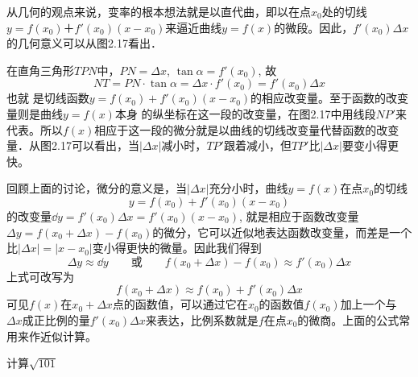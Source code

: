 从几何的观点来说，变率的根本想法就是以直代曲，即以在点$x_0$处的切线$y=f(x_0)＋f'(x_0)(x-x_0)$来逼近曲线$y=f(x)$的微段。因此，$f'(x_0)\Delta x$的几何意义可以从图2.17看出．

\begin{figure}[htp]
    \centering
    \caption{}
\end{figure}

在直角三角形$TPN$中，$PN=\Delta x$, $\tan\alpha=f'(x_0)$, 故
\[NT=PN\cdot \tan\alpha=\Delta x\cdot f'(x_0)=f'(x_0)\Delta x\]
也就
是切线函数$y=f (x_0) +f' (x_0) (x-x_0)$的相应改变量。至于函数的改变量则是曲线$y=f(x)$本身
的纵坐标在这一段的改变量，在图2.17中用线段$NP'$来代表。所以$f(x)$相应于这一段的微分就是以曲线的切线改变量代替函数的改变量．从图2.17可以看出，当$|\Delta x|$减小时，$TP'$跟着减小，但$TP'$比$|\Delta x|$要变小得更快。

回顾上面的讨论，微分的意义是，当$|\Delta x|$充分小时，曲线$y=f(x)$在点$x_0$的切线
\[y=f (x_0) +f' (x_0) (x-x_0)\]
的改变量$\dd y=f'(x_0)\Delta x=f'(x_0)(x-x_0)$, 就是相应于函数改变量$\Delta y=f(x_0+\Delta x)-f(x_0)$的微分，它可以近似地表达函数改变量，而差是一个比$|\Delta x|=|x-x_0|$变小得更快的微量。因此我们得到
\[\Delta y\approx \dd y\qquad \text{或}\qquad f(x_0+\Delta x)-f(x_0)\approx f'(x_0)\Delta x\]
上式可改写为
\[f (x_0+\Delta x) \approx f (x_0) +f' (x_0) \Delta x\]
可见$f(x)$在$x_0+\Delta x$点的函数值，可以通过它在$x_0$的函数值$f(x_0)$加上一个与$\Delta x$成正比例的量$f'(x_0)\Delta x$来表达，比例系数就是$f$在点$x_0$的微商。上面的公式常用来作近似计算。

\begin{example}
    计算$\sqrt{101}$
\end{example}


